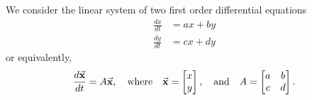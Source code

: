 We consider the linear system of two first order
differential equations
\begin{equation}
\begin{split}
  \frac{dx}{dt} & = ax + by \\
  \frac{dy}{dt} & = cx + dy
\end{split}
\label{eqn:linearsys_scalar_eqns}
\end{equation}
or equivalently,
\begin{equation}
  \frac{d\vec{\textbf{x}}}{dt} = A\vec{\textbf{x}}, \quad \textrm{where} \quad
     \vec{\textbf{x}} = \begin{bmatrix} x \\ y \end{bmatrix},
     \quad \textrm{and} \quad
     A = \begin{bmatrix} a & b \\ c & d \end{bmatrix}.
\label{eqn:linearsys}
\end{equation}


